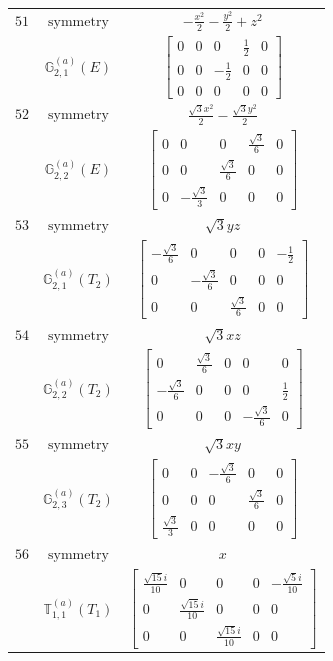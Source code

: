 \documentclass[fleqn,8pt,landscape]{jsarticle}
\begin{document}
\begin{longtable}{ccc}
$ 51 $ & $ \text{symmetry} $ & $ - \frac{x^{2}}{2} - \frac{y^{2}}{2} + z^{2} $ \\
$  $ & $ \mathbb{G}_{2,1}^{(a)}(E) $ & $ \begin{bmatrix} 0 & 0 & 0 & \frac{1}{2} & 0 \\ 0 & 0 & - \frac{1}{2} & 0 & 0 \\ 0 & 0 & 0 & 0 & 0 \end{bmatrix} $ \\ \hline
$ 52 $ & $ \text{symmetry} $ & $ \frac{\sqrt{3} x^{2}}{2} - \frac{\sqrt{3} y^{2}}{2} $ \\
$  $ & $ \mathbb{G}_{2,2}^{(a)}(E) $ & $ \begin{bmatrix} 0 & 0 & 0 & \frac{\sqrt{3}}{6} & 0 \\ 0 & 0 & \frac{\sqrt{3}}{6} & 0 & 0 \\ 0 & - \frac{\sqrt{3}}{3} & 0 & 0 & 0 \end{bmatrix} $ \\ \hline
$ 53 $ & $ \text{symmetry} $ & $ \sqrt{3} y z $ \\
$  $ & $ \mathbb{G}_{2,1}^{(a)}(T_{2}) $ & $ \begin{bmatrix} - \frac{\sqrt{3}}{6} & 0 & 0 & 0 & - \frac{1}{2} \\ 0 & - \frac{\sqrt{3}}{6} & 0 & 0 & 0 \\ 0 & 0 & \frac{\sqrt{3}}{6} & 0 & 0 \end{bmatrix} $ \\ \hline
$ 54 $ & $ \text{symmetry} $ & $ \sqrt{3} x z $ \\
$  $ & $ \mathbb{G}_{2,2}^{(a)}(T_{2}) $ & $ \begin{bmatrix} 0 & \frac{\sqrt{3}}{6} & 0 & 0 & 0 \\ - \frac{\sqrt{3}}{6} & 0 & 0 & 0 & \frac{1}{2} \\ 0 & 0 & 0 & - \frac{\sqrt{3}}{6} & 0 \end{bmatrix} $ \\ \hline
$ 55 $ & $ \text{symmetry} $ & $ \sqrt{3} x y $ \\
$  $ & $ \mathbb{G}_{2,3}^{(a)}(T_{2}) $ & $ \begin{bmatrix} 0 & 0 & - \frac{\sqrt{3}}{6} & 0 & 0 \\ 0 & 0 & 0 & \frac{\sqrt{3}}{6} & 0 \\ \frac{\sqrt{3}}{3} & 0 & 0 & 0 & 0 \end{bmatrix} $ \\ \hline
$ 56 $ & $ \text{symmetry} $ & $ x $ \\
$  $ & $ \mathbb{T}_{1,1}^{(a)}(T_{1}) $ & $ \begin{bmatrix} \frac{\sqrt{15} i}{10} & 0 & 0 & 0 & - \frac{\sqrt{5} i}{10} \\ 0 & \frac{\sqrt{15} i}{10} & 0 & 0 & 0 \\ 0 & 0 & \frac{\sqrt{15} i}{10} & 0 & 0 \end{bmatrix} $ \\ \hline

\end{longtable}
\end{document}
